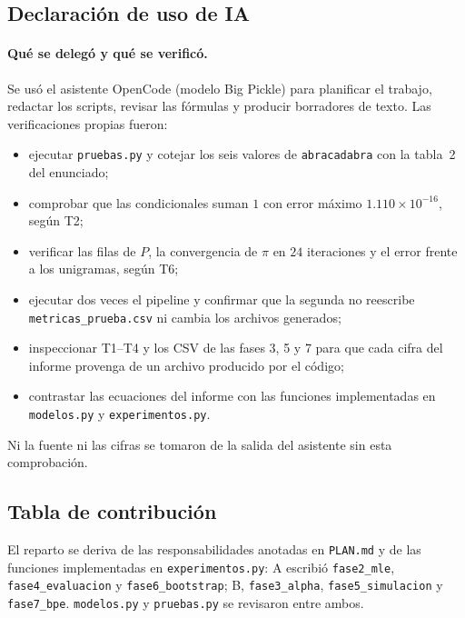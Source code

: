 \documentclass[11pt,letterpaper]{article}
\begin{document}
	\subsection*{Declaración de uso de IA}
	
	\paragraph{Qué se delegó y qué se verificó.}
	Se usó el asistente OpenCode (modelo Big Pickle) para planificar el trabajo, redactar los scripts, revisar las fórmulas y producir borradores de texto. Las verificaciones propias fueron:
	
	\begin{itemize}
		\item ejecutar \texttt{pruebas.py} y cotejar los seis valores de \texttt{abracadabra} con la tabla~2 del enunciado;
		\item comprobar que las condicionales suman $1$ con error máximo $1.110 \times 10^{-16}$, según T2;
		\item verificar las filas de $P$, la convergencia de $\pi$ en $24$ iteraciones y el error frente a los unigramas, según T6;
		\item ejecutar dos veces el pipeline y confirmar que la segunda no reescribe \texttt{metricas\_prueba.csv} ni cambia los archivos generados;
		\item inspeccionar T1--T4 y los CSV de las fases 3, 5 y 7 para que cada cifra del informe provenga de un archivo producido por el código;
		\item contrastar las ecuaciones del informe con las funciones implementadas en \texttt{modelos.py} y \texttt{experimentos.py}.
	\end{itemize}
	
	Ni la fuente ni las cifras se tomaron de la salida del asistente sin esta comprobación.
	
	\subsection*{Tabla de contribución}
	
	El reparto se deriva de las responsabilidades anotadas en \texttt{PLAN.md} y de las funciones implementadas en \texttt{experimentos.py}: A escribió \texttt{fase2\_mle}, \texttt{fase4\_evaluacion} y \texttt{fase6\_bootstrap}; B, \texttt{fase3\_alpha}, \texttt{fase5\_simulacion} y \texttt{fase7\_bpe}. \texttt{modelos.py} y \texttt{pruebas.py} se revisaron entre ambos.
	
\end{document}
